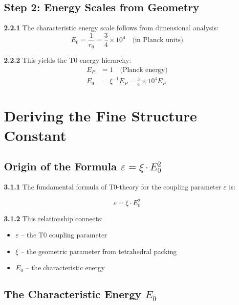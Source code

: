 \documentclass[12pt,a4paper]{article}
\newcommand{\EP}{E_P}
\newcommand{\rzero}{r_0}
\newcommand{\Ezero}{E_0}
\newcommand{\xipar}{\xi}
\begin{document}
	\subsection{Step 2: Energy Scales from Geometry}
	
	\noindent \textbf{2.2.1} The characteristic energy scale follows from dimensional analysis:
	\begin{equation}
		\Ezero = \frac{1}{\rzero} = \frac{3}{4} \times 10^{4} \quad \text{(in Planck units)}
	\end{equation}
	
	\noindent \textbf{2.2.2} This yields the T0 energy hierarchy:
	\begin{align}
		\EP &= 1 \quad \text{(Planck energy)} \\
		\Ezero &= \xipar^{-1} \EP = \frac{3}{4} \times 10^{4} \EP
	\end{align}
	
	\section{Deriving the Fine Structure Constant}
	
	\subsection{Origin of the Formula $\varepsilon = \xipar \cdot \Ezero^2$}
	
	\noindent \textbf{3.1.1} The fundamental formula of T0-theory for the coupling parameter $\varepsilon$ is:
	\begin{keyresult}
		\begin{equation}
			\boxed{\varepsilon = \xipar \cdot \Ezero^2}
			\label{eq:epsilon_definition}
		\end{equation}
	\end{keyresult}
	
	\noindent \textbf{3.1.2} This relationship connects:
	\begin{itemize}
		\item $\varepsilon$ -- the T0 coupling parameter
		\item $\xipar$ -- the geometric parameter from tetrahedral packing
		\item $\Ezero$ -- the characteristic energy
	\end{itemize}
	
	\subsection{The Characteristic Energy $\Ezero$}
	
\end{document}

